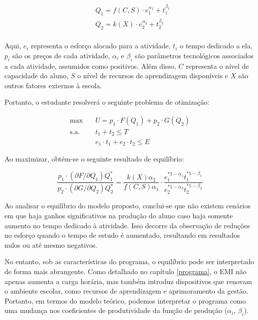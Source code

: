 \begin{equation}
\begin{aligned}
& Q_1 = f(C, S) \cdot e_1^{\alpha_1} + t_1^{\beta_1} \\
& Q_2 = k(X) \cdot e_2^{\alpha_2} + t_2^{\beta_2} \\
\end{aligned}
\end{equation}

Aqui, \(e_i\) representa o esforço alocado para a atividade, \(t_i\) o tempo dedicado a ela, \(p_i\) são os preços de cada atividade, \(\alpha_i\) e \(\beta_i\) são parâmetros tecnológicos associados a cada atividade, assumidos como positivos. Além disso, \(C\) representa o nível de capacidade do aluno, \(S\) o nível de recursos de aprendizagem disponíveis e \(X\) são outros fatores externos à escola.

Portanto, o estudante resolverá o seguinte problema de otimização:

\begin{equation}
\begin{aligned}
\max \quad & U = p_1 \cdot F(Q_1) + p_2 \cdot G(Q_2) \\
\textrm{s.a.} \quad & t_1 + t_2 \leq T\\
& e_1 \cdot t_1 + e_2 \cdot t_2 \leq E
\end{aligned}
\end{equation}

Ao maximizar, obtém-se o seguinte resultado de equilíbrio:

\begin{equation}
    \frac{p_1 \cdot (\partial F/ \partial Q_1)Q_1^*}{p_2 \cdot (\partial G/ \partial Q_2)Q_2^*} = \frac{k(X) \alpha_2}{f(C,S)\alpha_1} \cdot \frac{e_1^{*1-\alpha_1}t_1^{*1-\beta_1}}{e_2^{*1-\alpha_2}t_2^{*1-\beta_2}}
\end{equation}

Ao analisar o equilíbrio do modelo proposto, conclui-se que não existem cenários em que haja ganhos significativos na produção do aluno caso haja somente aumento no tempo dedicado à atividade. Isso decorre da observação de reduções no esforço quando o tempo de estudo é aumentado, resultando em resultados nulos ou até mesmo negativos.

No entanto, sob as características do programa, o equilíbrio pode ser interpretado de forma mais abrangente. Como detalhado no capítulo \ref{programa}, o EMI não apenas aumenta a carga horária, mas também introduz dispositivos que renovam o ambiente escolar, como recursos de aprendizagem e aprimoramento da gestão. Portanto, em termos do modelo teórico, podemos interpretar o programa como uma mudança nos coeficientes de produtividade da função de produção (\(\alpha_i\), \(\beta_i\)).

